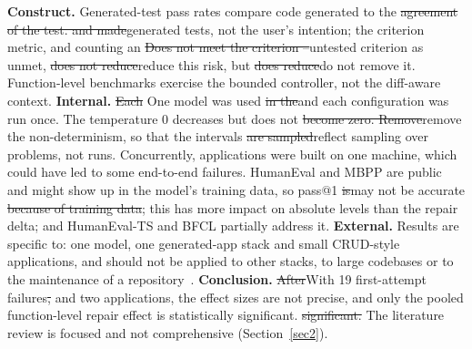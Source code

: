 \documentclass[pdflatex,sn-mathphys-num]{sn-jnl}%
\newcommand{\fix}[1]{{\color{fixcol}#1}}
\newcommand{\fixdel}[1]{{\color{fixcol}\sout{#1}}}
\newcommand{\rw}[2]{{\color{rwcol}#1}}%
\theoremstyle{thmstyleone}%
\theoremstyle{thmstyletwo}%
\theoremstyle{thmstylethree}%
\begin{document}
\rw{\textbf{Construct.} Generated-test pass rates compare code generated to the \fixdel{agreement of the test. and made}\fix{generated} tests, not the user's intention; the criterion metric, and counting an \fixdel{Does not meet the criterion --}\fix{untested criterion as unmet,} \fixdel{does not reduce}\fix{reduce} this risk, but \fixdel{does reduce}\fix{do not remove} it. Function-level benchmarks exercise the bounded controller, not the diff-aware context. \textbf{Internal.} \fixdel{Each} One model was used \fixdel{in the}\fix{and each} configuration\fix{ was run once}. The temperature 0 decreases but does not \fixdel{become zero. Remove}\fix{remove} the non-determinism, so that the intervals \fixdel{are sampled}\fix{reflect sampling} over problems, not runs. Concurrently, applications were built on one machine, which could have led to some end-to-end failures. HumanEval and MBPP are public and might show up in the model's \fix{training data, so} pass@1 \fixdel{is}\fix{may} not \fix{be} accurate\fixdel{ because of training data}; this has more impact on absolute levels than the repair delta; and HumanEval-TS and BFCL partially address it. \textbf{External.} Results are specific to: one model, one generated-app stack and small CRUD-style applications, and should not be applied to other stacks, to large codebases or to the maintenance of a repository~\cite{r12jiang,r14bouzenia}. \textbf{Conclusion.} \fixdel{After}\fix{With} 19 \fix{first-attempt} failures\fixdel{,} and two applications, the effect sizes are not precise, and only the pooled function-level repair effect is statistically significant.\fixdel{ significant.} The literature review is focused and not comprehensive (Section~\ref{sec2}).}{\textbf{Construct.} Generated-test pass rates measure agreement between generated code and generated tests, not the user's intent; the criterion metric, and counting an untested criterion as unmet, reduce but do not remove this risk. Function-level benchmarks exercise the bounded controller, not the diff-aware context. \textbf{Internal.} Each configuration was run once with one model. Temperature 0 reduces but does not remove non-determinism, so the intervals reflect sampling over problems, not over runs. Application builds ran concurrently on one machine, which may have caused some end-to-end failures. HumanEval and MBPP are public and may appear in the model's training data, inflating pass@1; this affects absolute levels more than the repair delta, and HumanEval-TS and BFCL partly mitigate it. \textbf{External.} Results are specific to one model, one generated-app stack and small CRUD-style applications, and should not be generalised to other stacks, large existing codebases or repository-level maintenance \cite{r12jiang,r14bouzenia}. \textbf{Conclusion.} With 19 first-attempt failures and two applications, effect sizes are imprecise; only the pooled function-level repair effect is statistically significant. The literature review is targeted rather than exhaustive (Section~\ref{sec2}).}
\end{document}
